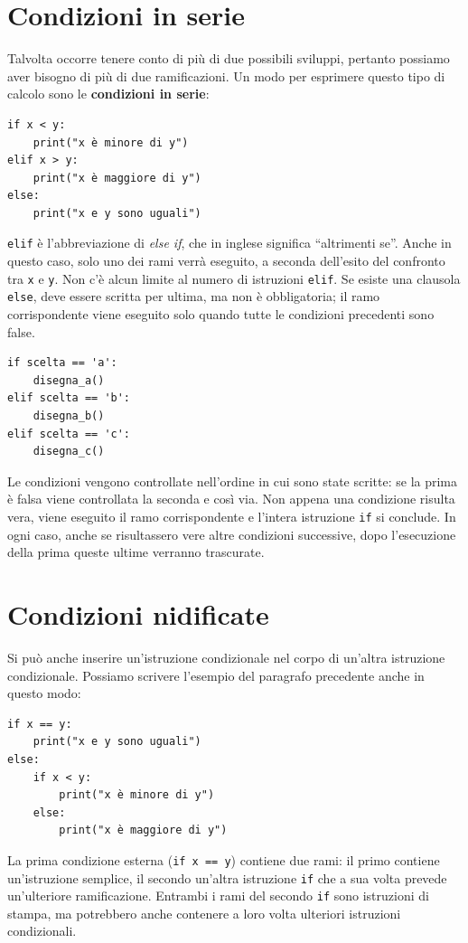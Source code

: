 \documentclass[10pt]{book}
\begin{document}
\section{Condizioni in serie}

Talvolta occorre tenere conto di più di due possibili sviluppi, pertanto possiamo aver bisogno di più di due ramificazioni. Un modo per esprimere questo tipo di calcolo sono le {\bf condizioni in serie}:

\begin{verbatim}
if x < y:
    print("x è minore di y")
elif x > y:
    print("x è maggiore di y")
else:
    print("x e y sono uguali")
\end{verbatim}
%
{\tt elif} è l'abbreviazione di {\em else if}, che in inglese significa   ``altrimenti se''. Anche in questo caso, solo uno dei rami verrà eseguito, a seconda dell'esito del confronto tra {\tt x} e {\tt y}. Non c'è alcun limite al numero di istruzioni {\tt elif}. Se esiste una clausola {\tt else}, deve essere scritta per ultima, ma non è obbligatoria; il ramo corrispondente viene eseguito solo quando tutte le condizioni precedenti sono false.


\begin{verbatim}
if scelta == 'a':
    disegna_a()
elif scelta == 'b':
    disegna_b()
elif scelta == 'c':
    disegna_c()
\end{verbatim}
%
Le condizioni vengono controllate nell'ordine in cui sono state scritte: se la prima è falsa viene controllata la seconda e così via. Non appena una condizione risulta vera, viene eseguito il ramo corrispondente e l'intera istruzione {\tt if} si conclude. In ogni caso, anche se risultassero vere altre condizioni successive, dopo l'esecuzione della prima queste ultime verranno trascurate.  


\section{Condizioni nidificate}

Si può anche inserire un'istruzione condizionale nel corpo di un'altra istruzione condizionale. Possiamo scrivere l'esempio del paragrafo precedente anche in questo modo:

\begin{verbatim}
if x == y:
    print("x e y sono uguali")
else:
    if x < y:
        print("x è minore di y")
    else:
        print("x è maggiore di y")
\end{verbatim}
%
La prima condizione esterna ({\tt if x == y}) contiene due rami: il primo contiene un'istruzione semplice, il secondo un'altra istruzione {\tt if} che a sua volta prevede un'ulteriore ramificazione. Entrambi i rami del secondo {\tt if} sono istruzioni di stampa, ma potrebbero anche contenere a loro volta ulteriori istruzioni condizionali.
\end{document}
